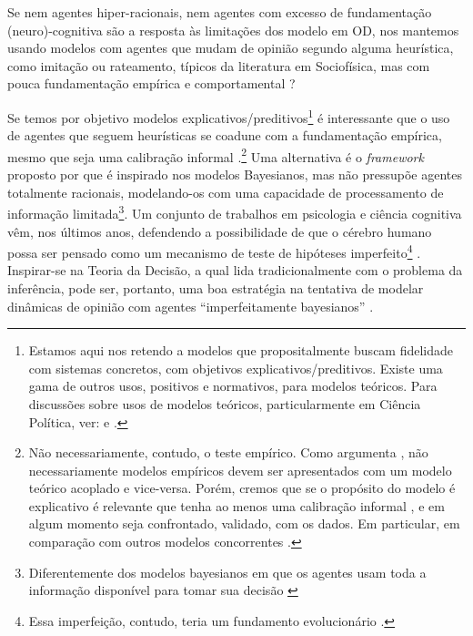 Se nem agentes hiper-racionais, nem agentes com excesso de fundamentação
(neuro)-cognitiva são a resposta às limitações dos modelo em OD, nos mantemos
usando modelos  com agentes que mudam de opinião segundo alguma
heurística, como imitação ou rateamento, típicos da literatura em Sociofísica,
mas com pouca fundamentação empírica e comportamental
\cite{acemoglu2011opinion}?

Se temos por objetivo modelos explicativos/preditivos\footnote{Estamos aqui nos
  retendo a modelos que propositalmente buscam fidelidade com sistemas
  concretos, com objetivos explicativos/preditivos. Existe uma gama de outros
  usos, positivos e normativos, para modelos teóricos. Para discussões sobre
  usos de modelos teóricos, particularmente em Ciência Política, ver:
   e .} é interessante
que o uso de agentes que seguem heurísticas se coadune com a fundamentação
empírica, mesmo que seja uma calibração informal \cite{flache2017}.\footnote{Não
  necessariamente, contudo, o teste empírico. Como argumenta
  , não necessariamente modelos empíricos devem ser
  apresentados com um modelo teórico acoplado e vice-versa. Porém, cremos que se
  o propósito do modelo é explicativo  é relevante que tenha  ao menos uma calibração
  informal \cite{flache2017}, e em algum momento seja confrontado, validado,
  com os dados. Em particular, em comparação com outros modelos concorrentes
  \cite{clarke2012model}. } Uma alternativa é o \textit{framework} proposto por
 que é inspirado nos modelos Bayesianos, mas não
pressupõe agentes totalmente racionais, modelando-os com uma capacidade de
processamento de informação limitada\footnote{Diferentemente dos modelos
  bayesianos em que os agentes usam toda a informação disponível para tomar sua
  decisão \cite{jackman2009bayesian}}. Um conjunto de trabalhos em psicologia e
ciência cognitiva vêm, nos últimos anos, defendendo a possibilidade de que o
cérebro humano possa ser pensado como um mecanismo de teste de hipóteses
imperfeito\footnote{Essa imperfeição, contudo, teria um fundamento evolucionário
  \cite{price2016hierarchical,martins2005adaptive}.}
\cite{hohwy2013predictive,sanborn2016bayesian}. Inspirar-se na Teoria da
Decisão, a qual lida tradicionalmente com o problema da inferência, pode ser,
portanto, uma boa estratégia na tentativa de modelar dinâmicas de opinião com
agentes ``imperfeitamente bayesianos''
\cite{griffiths2006optimal,fujikawa2007perfect,baker2017rational}.

